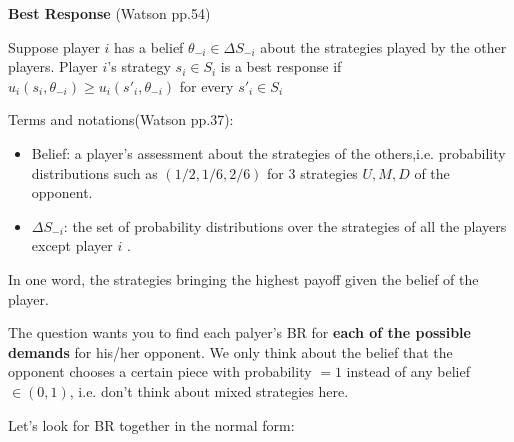 \documentclass{article}
\begin{document}
\begin{mdframed}[backgroundcolor=blue!20,linecolor=white]
\textbf{Best Response} (Watson pp.54)

Suppose player $i$ has a belief $\theta_{-i} \in \Delta S_{-i}$ about the strategies played
by the other players. Player $i$'s strategy $s_i \in S_i$ is a best response if
$u_i (s_i , \theta_{-i} ) \ge u_i (s'_i , \theta_{-i})$ for every $s'_i \in S_i$

\vspace{4mm}

Terms and notations(Watson pp.37):
\begin{itemize}
\item Belief: a player's assessment about the strategies of the others,i.e. probability distributions such as $(1/2,1/6,2/6)$ for 3 strategies $U,M,D$ of the opponent.
\item $\Delta S_{-i}$: the set of probability distributions over the strategies of all the players except player $i$ .
\end{itemize}

In one word, the strategies bringing the highest payoff given the belief of the player.

\vspace{4mm}

The question wants you to find each palyer's  BR for \textbf{each of the possible demands} for his/her opponent. We only think about the belief that the opponent chooses a certain piece with probability $=1$ instead of any belief $\in (0,1)$, i.e. don't think about mixed strategies here.

\newpage

Let's look for BR together in the normal form:


\end{mdframed}
\end{document}
